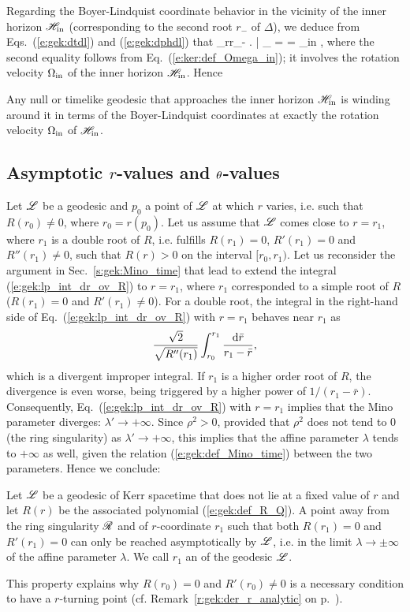 Regarding the Boyer-Lindquist coordinate behavior in the vicinity of the inner
horizon $\mathscr{H}_{\rm in}$ (corresponding to the second root $r_-$ of $\Delta$), we deduce
from
Eqs.~(\ref{e:gek:dtdl}) and
(\ref{e:gek:dphdl}) that
\be
    \lim_{r\to r_-} \left.  \right| _{\Li} =  = \Omega_{\rm in} ,
\ee
where the second equality follows from Eq.~(\ref{e:ker:def_Omega_in}); it involves
the rotation velocity $\Omega_{\rm in}$ of the inner horizon $\mathscr{H}_{\rm in}$.
Hence
\begin{prop}
Any null or timelike geodesic that approaches the inner horizon $\mathscr{H}_{\rm in}$
is winding around it in terms of the Boyer-Lindquist coordinates at exactly the
rotation velocity $\Omega_{\rm in}$ of $\mathscr{H}_{\rm in}$.
\end{prop}

\subsection{Asymptotic $r$-values and $\theta$-values} \label{s:gek:asymptotic_values}

Let $\mathscr{L}$ be a geodesic
and $p_0$ a point of $\mathscr{L}$ at which $r$ varies,
i.e. such that $R(r_0) \neq 0$, where $r_0 = r(p_0)$.
Let us assume that $\mathscr{L}$ comes close to $r=r_1$, where
$r_1$ is a double root of $R$, i.e. fulfills $R(r_1)=0$, $R'(r_1)=0$ and
$R''(r_1)\neq 0$, such that $R(r) > 0$ on the interval $[r_0, r_1)$.
Let us reconsider the argument in Sec.~\ref{s:gek:Mino_time}
that lead to extend the integral
(\ref{e:gek:lp_int_dr_ov_R}) to $r=r_1$, where $r_1$ corresponded to
a simple root of $R$ ($R(r_1)=0$ and $R'(r_1)\neq 0$).
For a double root,
the integral in the right-hand side of Eq.~(\ref{e:gek:lp_int_dr_ov_R}) with $r=r_1$ behaves
near $r_1$ as
\[
    \frac{\sqrt{2}}{\sqrt{R''(r_1)}} \int_{r_0}^{r_1} \frac{\mathrm{d} \bar{r}}{r_1 - \bar{r}} ,
\]
which is a divergent improper integral. If $r_1$ is a higher order root of $R$,
the divergence is even worse, being triggered by a higher power of $1/(r_1 - \bar{r})$.
Consequently, Eq.~(\ref{e:gek:lp_int_dr_ov_R}) with $r=r_1$
implies that the Mino parameter diverges: $\lambda'\to +\infty$. Since $\rho^2 > 0$,
provided that $\rho^2$
does not tend to $0$ (the ring singularity) as $\lambda'\to +\infty$, this
implies that the affine parameter $\lambda$ tends to $+\infty$ as well, given
the relation (\ref{e:gek:def_Mino_time}) between the two parameters.
Hence we conclude:
\begin{prop}
Let $\mathscr{L}$ be a geodesic of Kerr spacetime that does not lie at a fixed value of $r$
and let $R(r)$ be the associated polynomial
(\ref{e:gek:def_R_Q}).
A point away from the ring singularity $\mathscr{R}$ and of $r$-coordinate $r_1$
such that both $R(r_1) = 0$ and $R'(r_1) = 0$
can only be reached asymptotically by $\mathscr{L}$, i.e. in the limit
$\lambda\to \pm\infty$ of the affine parameter
$\lambda$. We call $r_1$ an  of the geodesic $\mathscr{L}$.
\end{prop}
This property explains why $R(r_0) = 0$ and $R'(r_0) \neq 0$ is a necessary condition
to have a $r$-turning point (cf. Remark~\ref{r:gek:der_r_analytic} on p.~\pageref{r:gek:der_r_analytic}).


